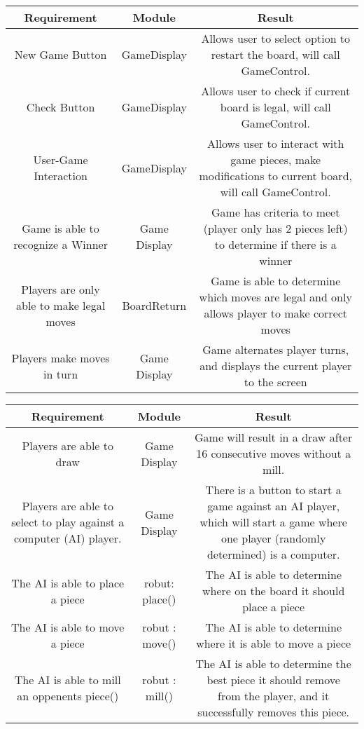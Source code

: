 \documentclass[12pt]{article}
\begin{document}
		\begin{tabularx}{\linewidth}{|C|C|C|}
			\hline 
			Requirement & Module & Result \\
			\hline 
				New Game Button & GameDisplay & Allows user to select option to restart the board, will call GameControl. \\
				\hline 
				Check Button & GameDisplay  & Allows user to check if current board is legal, will call GameControl. \\
				\hline 
				User-Game Interaction & GameDisplay &Allows user to interact with game pieces, make modifications to current board, will call GameControl. \\
				\hline 	
			Game is able to recognize a Winner & Game Display & Game has criteria to meet (player only has 2 pieces left) to determine if there is a winner \\
			\hline 
			Players are only able to make legal moves & BoardReturn & Game is able to determine which moves are legal and only allows player to make correct moves \\
			\hline 
			Players make moves in turn & Game Display & Game alternates player turns, and displays the current player to the screen \\
			\hline 
				
		\end{tabularx}
		\begin{tabularx}{\linewidth}{|C|C|C|}
			\hline 
			Requirement & Module & Result \\
			\hline 
			Players are able to draw & Game Display & Game will result in a draw after 16 consecutive moves without a mill.\\
			\hline 
			Players are able to select to play against a computer (AI) player. & Game Display & There is a button to start a game against an AI player, which will start a game where one player (randomly determined) is a computer. \\ \hline 
			The AI is able to place a piece & robut: place() & The AI is able to determine where on the board it should place a piece \\ \hline
			The AI is able to move a piece & robut : move() & The AI is able to determine where it is able to move a piece \\ \hline 
			The AI is able to mill an oppenents piece() & robut : mill() & The AI is able to determine the best piece it should remove from the player, and it successfully removes this piece. \\ 
			\hline
		\end{tabularx}
\end{document}
